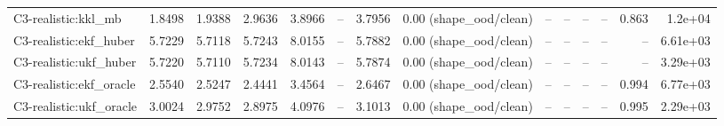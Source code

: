 \begin{table}[t]
\begin{tabular}{lrrrrrrrrrrrrr}
C3-realistic:kkl\_mb & 1.8498 & 1.9388 & 2.9636 & 3.8966 & – & 3.7956 & 0.00 (shape\_ood/clean) & – & – & – & – & 0.863 & 1.2e+04 \\
C3-realistic:ekf\_huber & 5.7229 & 5.7118 & 5.7243 & 8.0155 & – & 5.7882 & 0.00 (shape\_ood/clean) & – & – & – & – & – & 6.61e+03 \\
C3-realistic:ukf\_huber & 5.7220 & 5.7110 & 5.7234 & 8.0143 & – & 5.7874 & 0.00 (shape\_ood/clean) & – & – & – & – & – & 3.29e+03 \\
C3-realistic:ekf\_oracle & 2.5540 & 2.5247 & 2.4441 & 3.4564 & – & 2.6467 & 0.00 (shape\_ood/clean) & – & – & – & – & 0.994 & 6.77e+03 \\
C3-realistic:ukf\_oracle & 3.0024 & 2.9752 & 2.8975 & 4.0976 & – & 3.1013 & 0.00 (shape\_ood/clean) & – & – & – & – & 0.995 & 2.29e+03 \\
\bottomrule
\end{tabular}
\end{table}

